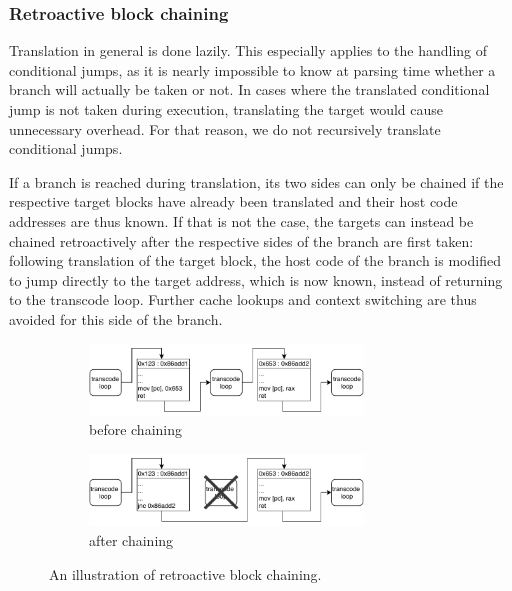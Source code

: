 \subsubsection{Retroactive block chaining}
\label{sec:chaining}
Translation in general is done lazily.
This especially applies to the handling of conditional jumps, as it is nearly impossible to know at parsing time whether a branch will actually be taken or not.
In cases where the translated conditional jump is not taken during execution, translating the target would cause unnecessary overhead.
For that reason, we do not recursively translate conditional jumps.

If a branch is reached during translation, its two sides can only be chained if the respective target blocks have already been translated and their host code addresses are thus known.
If that is not the case, the targets can instead be chained retroactively after the respective sides of the branch are first taken:
following translation of the target block, the host code of the branch is modified to jump directly to the target address, which is now known, instead of returning to the transcode loop.
Further cache lookups and context switching are thus avoided for this side of the branch.

\begin{figure}[h]
	\begin{center}
		\begin{subfigure}[b]{\textwidth}
			\centering
			\includegraphics[width=0.8\textwidth]{media/chaining-unchained.pdf}
			\caption{before chaining}
		\end{subfigure}
		\begin{subfigure}[b]{\textwidth}
			\centering
			\includegraphics[width=0.8\textwidth]{media/chaining-chained.pdf}
			\caption{after chaining}
		\end{subfigure}
	\end{center}
	
	\caption[Block chaining illustration]%
	{An illustration of retroactive block chaining.}
\end{figure}


